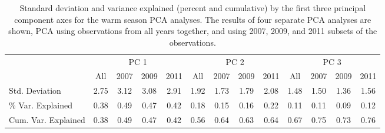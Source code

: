 
\begin{sidewaystable}

\centering

\caption{Standard deviation and variance explained (percent and cumulative) by the first three principal component axes for the warm season PCA analyses. The results of four separate PCA analyses are shown, PCA using observations from all years together, and using 2007, 2009, and 2011 subsets of the observations.\label{warm_eigen_t}}

\begin{tabular}{lcccccccccccc}
\toprule
{} & \multicolumn{4}{c}{PC 1}& \multicolumn{4}{c}{PC 2}& \multicolumn{4}{c}{PC 3}\\

\cmidrule(l){2-5} \cmidrule(l){6-9} \cmidrule(l){10-13}
{} &All	&2007 &2009 &2011 &All &2007 &2009 &2011 &All &2007 &2009 &2011\\
\midrule
Std. Deviation	&2.75	&3.12	&3.08	&2.91	&1.92	&1.73	&1.79	&2.08	&1.48	&1.50	&1.36	&1.56\\
\% Var. Explained	&0.38	&0.49	&0.47	&0.42	&0.18	&0.15	&0.16	&0.22	&0.11	&0.11	&0.09	&0.12\\
Cum. Var. Explained	&0.38	&0.49	&0.47	&0.42	&0.56	&0.64	&0.63	&0.64	&0.67	&0.75	&0.73	&0.76\\
\bottomrule
\end{tabular}

\end{sidewaystable}
